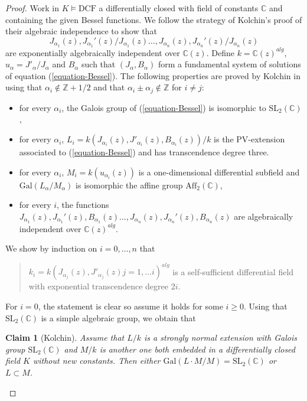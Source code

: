 \documentclass[12pt]{amsart}
\newcommand{\DCF}{\mathrm{DCF}}
\theoremstyle{definition}
\theoremstyle{plain}
\newtheorem*{claim}{Claim}
\theoremstyle{exampstyle}\newtheorem{thmx}{Theorem}
\theoremstyle{exampstyle}\newtheorem{thmxbis}{Theorem}
\begin{document}
\begin{proof} 
Work in $K \models \DCF$ a differentially closed with field of constants $\mathbb{C}$ and containing the given Bessel functions. We follow the strategy of Kolchin's proof of their algebraic independence to show that
$$J_{\alpha_1}(z), J_{\alpha_1}'(z)/J_{\alpha_1}(z) \ldots, J_{\alpha_n}(z), J_{\alpha_n}'(z)/J_{\alpha_n}(z)$$ 
are exponentially algebraically independent over $\mathbb{C}(z)$. Define  $k = \mathbb{C}(z)^{alg}$, $u_\alpha = J'_\alpha/J_\alpha$ and $B_\alpha$ such that $(J_\alpha, B_\alpha)$ form a fundamental system of solutions of equation (\ref{equation-Bessel}). The following properties are proved by Kolchin in \cite{Kolchin} using that  $\alpha_i \notin \mathbb{Z} + 1/2$ and that $\alpha_i \pm \alpha_j \notin \mathbb{Z}$ for $i \neq j$:
\begin{itemize}
\item[(i)] for every $\alpha_i$, the Galois group of (\ref{equation-Bessel}) is isomorphic to $\mathrm{SL}_2(\mathbb{C})$,
\item[(ii)] for every $\alpha_i$, $L_i = k(J_{\alpha_i}(z), J'_{\alpha_i}(z), B_{\alpha_i}(z))/k$ is the PV-extension associated to  (\ref{equation-Bessel}) and has transcendence degree three. 
\item[(iii)] for every $\alpha_i$, $M_i = k(u_{\alpha_i}(z))$ is a one-dimensional differential subfield and $\mathrm{Gal}(L_\alpha/M_\alpha)$ is isomorphic the affine group $\mathrm{Aff}_2(\mathbb{C})$,
\item[(iv)] for every $i$, the functions $J_{\alpha_1}(z), J_{\alpha_1}'(z), B_{\alpha_1}(z) \ldots, J_{\alpha_n}(z), J_{\alpha_n}'(z), B_{\alpha_n}(z)$ are algebraically independent over $\mathbb{C}(z)^{alg}$. 
\end{itemize}
We show by induction on $i = 0,\ldots, n$ that 
\begin{quote}
$k_i = k (J_{\alpha_j}(z),J'_{\alpha_j}(z) j = 1,\ldots i)^{alg}$ is a self-sufficient differential field with exponential transcendence degree $2i$. 
\end{quote}  
For $i = 0$, the statement is clear so assume it holds for some $i \geq 0$. Using that  $\mathrm{SL}_2(\mathbb{C})$ is a simple algebraic group, we obtain that
\begin{claim}[Kolchin]
Assume that $L/k$ is a strongly normal extension with Galois group $\mathrm{SL}_2(\mathbb{C})$ and $M/k$ is another one both embedded in a differentially closed field $K$ without new constants. Then either $\mathrm{Gal}(L \cdot M/M) = \mathrm{SL}_2(\mathbb{C})$ or $L \subset M$.

\end{claim}
\end{proof}
\end{document}
